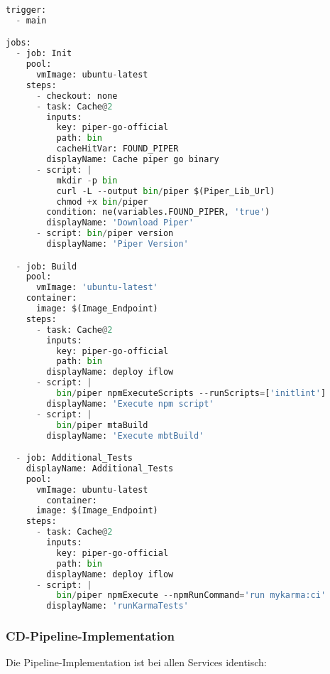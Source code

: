 \begin{lstlisting}[language=Python, breaklines=true, basicstyle=\small\ttfamily, frame=single]
  trigger:
  - main

jobs:
  - job: Init
    pool:
      vmImage: ubuntu-latest
    steps:
      - checkout: none
      - task: Cache@2
        inputs:
          key: piper-go-official
          path: bin
          cacheHitVar: FOUND_PIPER
        displayName: Cache piper go binary
      - script: |
          mkdir -p bin
          curl -L --output bin/piper $(Piper_Lib_Url)
          chmod +x bin/piper
        condition: ne(variables.FOUND_PIPER, 'true')
        displayName: 'Download Piper'
      - script: bin/piper version
        displayName: 'Piper Version'

  - job: Build
    pool:
      vmImage: 'ubuntu-latest'
    container:
      image: $(Image_Endpoint) 
    steps:
      - task: Cache@2
        inputs:
          key: piper-go-official
          path: bin
        displayName: deploy iflow
      - script: |
          bin/piper npmExecuteScripts --runScripts=['initlint']
        displayName: 'Execute npm script'
      - script: |
          bin/piper mtaBuild
        displayName: 'Execute mbtBuild'

  - job: Additional_Tests
    displayName: Additional_Tests
    pool:
      vmImage: ubuntu-latest
        container:
      image: $(Image_Endpoint) 
    steps:
      - task: Cache@2
        inputs:
          key: piper-go-official
          path: bin
        displayName: deploy iflow
      - script: |
          bin/piper npmExecute --npmRunCommand='run mykarma:ci'
        displayName: 'runKarmaTests'
        \end{lstlisting}
 
        \subsubsection{CD-Pipeline-Implementation}
        Die Pipeline-Implementation ist bei allen Services identisch:\\
        
